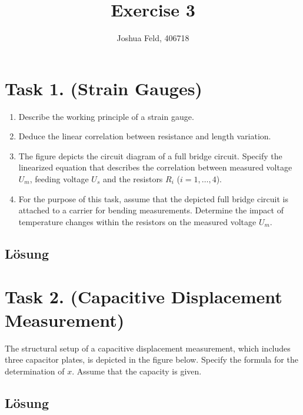 \documentclass[german,12pt]{homework}
\title{Exercise 3}
\author{Joshua Feld, 406718}
\institute{RWTH Aachen University\\Chair of Process Control Engineering}
\begin{document}
    \maketitle

    \section*{Task 1. (Strain Gauges)}

    \begin{problem}
        \begin{enumerate}
            \item Describe the working principle of a strain gauge.
            \item Deduce the linear correlation between resistance and length variation.
            \item The figure depicts the circuit diagram of a full bridge circuit. Specify the linearized equation that describes the correlation between measured voltage \(U_m\), feeding voltage \(U_s\) and the resistors \(R_i\) (\(i = 1, \ldots, 4\)).
            \item For the purpose of this task, assume that the depicted full bridge circuit is attached to a carrier for bending measurements. Determine the impact of temperature changes within the resistors on the measured voltage \(U_m\).
        \end{enumerate}
    \end{problem}

    \subsection*{Lösung}

    \section*{Task 2. (Capacitive Displacement Measurement)}
    \begin{problem}
        The structural setup of a capacitive displacement measurement, which includes three capacitor plates, is depicted in the figure below. Specify the formula for the determination of \(x\). Assume that the capacity is given.
    \end{problem}

    \subsection*{Lösung}
\end{document}

